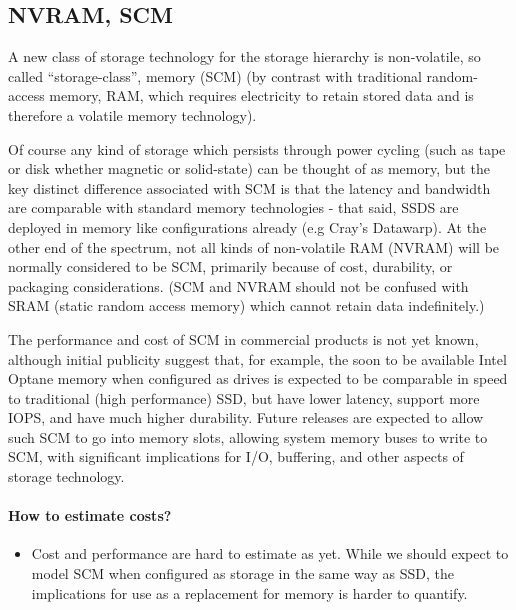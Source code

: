 \documentclass{../../template/esiwace-report}
\begin{document}
\subsection{NVRAM, SCM}

A new class of storage technology for the storage hierarchy is non-volatile, so called ``storage-class'', memory (SCM) (by contrast with traditional random-access memory, RAM, which requires electricity to retain stored data and is therefore a volatile memory technology).

Of course any kind of storage which persists through power cycling (such as tape or disk whether magnetic or solid-state) can be thought of as memory, but the key distinct difference associated with SCM is that the latency and bandwidth are comparable with standard memory technologies - that said, SSDS are deployed in memory like configurations already (e.g Cray's Datawarp\texttrademark). At the other end of the spectrum, not all kinds of non-volatile RAM (NVRAM) will be normally considered to be SCM, primarily because of cost, durability, or packaging considerations. (SCM and NVRAM should not be confused with SRAM (static random access memory) which cannot retain data indefinitely.)

The performance and cost of SCM in commercial products is not yet known, although initial publicity suggest that, for example, the soon to be available Intel Optane memory when configured as drives is expected to be comparable in speed to traditional (high performance) SSD, but have lower latency, support more IOPS, and have much higher durability.   Future releases are expected to allow such SCM to go into memory slots, allowing system memory buses to write to SCM, with significant implications for I/O, buffering, and other aspects of storage technology.

\paragraph{How to estimate costs?}
\begin{itemize}
	\item Cost and performance are hard to estimate as yet. While we should expect to model SCM when configured as storage in the same way as SSD, the implications for use as a replacement for memory is harder to quantify.
\end{itemize}

\end{document}
